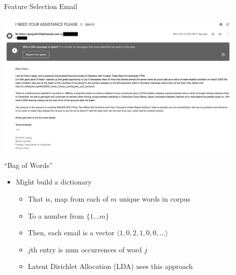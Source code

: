 \documentclass[aspectratio=169]{beamer}
\begin{document}
\begin{frame}{Feature Selection Email}

\centering
    \includegraphics[width=0.9\textwidth]{lectSup/spam.pdf}
\end{frame}
\begin{frame}{``Bag of Words''}

\begin{itemize}
\item Might build a dictionary
	\begin{itemize}
	\item That is, map from each of $m$ unique words in corpus
	\item To a number from $\{1...m\}$
	\item Then, each email is a vector $\langle 1, 0, 2, 1, 0, 0, ... \rangle$
	\item $j$th entry is num occurrences of word $j$
	\item Latent Dirichlet Allocation (LDA) uses this approach
	\end{itemize}
\end{itemize}
\end{frame}
\end{document}
